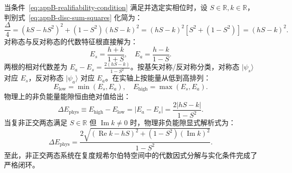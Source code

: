 当条件~\eqref{eq:appB-realifiability-condition} 满足并选定实相位时，设 $S \in \mathbb{R}, k \in \mathbb{R}$，判别式~\eqref{eq:appB-disc-sum-squares} 化简为：
\begin{equation}
\frac{\Delta}{4} = (k S - h S^2)^2 + (1 - S^2)(h S - k)^2 = (h S - k)^2 [S^2 + (1 - S^2)] = (h S - k)^2.
\end{equation}
对称态与反对称态的代数特征根直接解为：
\begin{equation}\label{eq:appB-unordered-roots}
E_s = \frac{h + k}{1 + S}, \quad E_a = \frac{h - k}{1 - S}.
\end{equation}
两根的相对代数差为 $E_a - E_s = \frac{2(h S - k)}{1 - S^2}$。按基矢对称/反对称分类，对称态 $|\psi_s\rangle$ 对应 $E_s$，反对称态 $|\psi_a\rangle$ 对应 $E_a$。在实轴上按能量从低到高排列：
\begin{equation}\label{eq:appB-ordered-energies}
E_{\text{low}} = \min(E_s, E_a), \quad E_{\text{high}} = \max(E_s, E_a).
\end{equation}
物理上的非负能量能隙恒由绝对值给出：
\begin{equation}\label{eq:appB-physical-gap}
\Delta E_{\text{phys}} \equiv E_{\text{high}} - E_{\text{low}} = |E_a - E_s| = \frac{2|h S - k|}{1 - S^2}.
\end{equation}
当复非正交两态满足 $S \in \mathbb{R}$ 但 $\operatorname{Im}k \ne 0$ 时，物理非负能隙显式解析式为：
\begin{equation}\label{eq:appB-complex-gap}
\Delta E_{\text{phys}} = \frac{2\sqrt{ (\operatorname{Re}k - h S)^2 + (1 - S^2)(\operatorname{Im}k)^2 }}{1 - S^2}.
\end{equation}
至此，非正交两态系统在复度规希尔伯特空间中的代数因式分解与实化条件完成了严格闭环。
